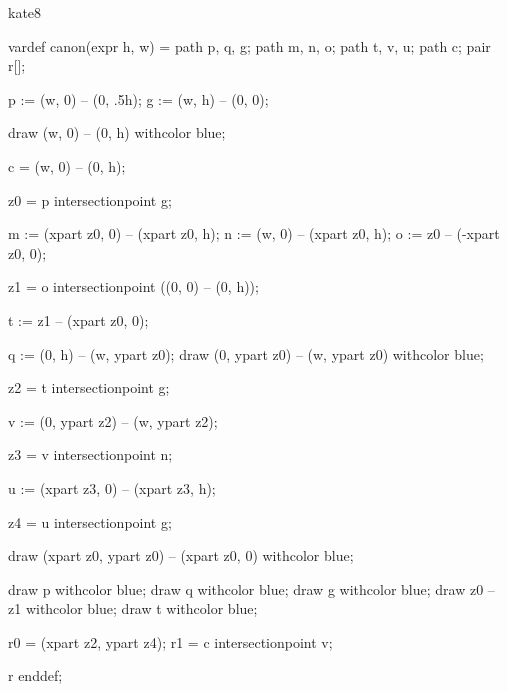 %
%
%


\startenvironment kate8

	\startMPdefinitions
		vardef canon(expr h, w) =
			path p, q, g;
			path m, n, o;
			path t, v, u;
			path c;
			pair r[];

			p := (w, 0) -- (0, .5h); %
			g := (w, h) -- (0, 0); %

			draw (w, 0) -- (0, h) withcolor blue;

			c = (w, 0) -- (0, h);

			z0 = p intersectionpoint g; %

			m := (xpart z0, 0) -- (xpart z0, h); %
			n := (w, 0) -- (xpart z0, h); %
			o := z0 -- (-xpart z0, 0); %

			z1 = o intersectionpoint ((0, 0) -- (0, h)); %

			t := z1 -- (xpart z0, 0); %

			q := (0, h) -- (w, ypart z0); %
			draw (0, ypart z0) -- (w, ypart z0) withcolor blue;

			z2 = t intersectionpoint g; %

			v := (0, ypart z2) -- (w, ypart z2); %

			z3 = v intersectionpoint n; %

			u := (xpart z3, 0) -- (xpart z3, h); %

			z4 = u intersectionpoint g; %

			draw (xpart z0, ypart z0) -- (xpart z0, 0) withcolor blue;

			draw p withcolor blue;
			draw q withcolor blue;
			draw g withcolor blue;
			draw z0 -- z1 withcolor blue;
			draw t withcolor blue;

			r0 = (xpart z2, ypart z4); %
			r1 = c intersectionpoint v; %

			r
		enddef;

	\stopMPdefinitions

\stopenvironment

